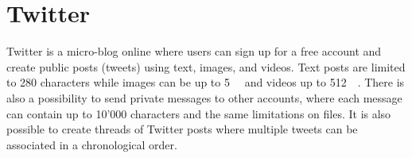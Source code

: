 \section{Twitter}
Twitter is a micro-blog online where users can sign up for a free account and create public posts (tweets) using text, images, and videos. Text posts are limited to 280 characters while images can be up to \SI{5}{\mega\byte} and videos up to \SI{512}{\mega\byte}\cite{MediaBestPractices}. There is also a possibility to send private messages to other accounts, where each message can contain up to 10'000 characters and the same limitations on files. %
It is also possible to create threads of Twitter posts where multiple tweets can be associated in a chronological order.

